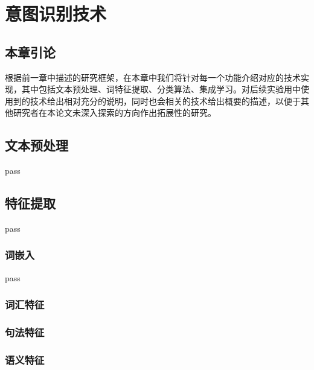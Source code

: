 \chapter{意图识别技术}
\label{cha:tech}

\section{本章引论}

根据前一章中描述的研究框架，在本章中我们将针对每一个功能介绍对应的技术实现，其中包括文本预处理、词特征提取、分类算法、集成学习。对后续实验用中使用到的技术给出相对充分的说明，同时也会相关的技术给出概要的描述，以便于其他研究者在本论文未深入探索的方向作出拓展性的研究。

\section{文本预处理}

pass

\section{特征提取}

pass

\subsection{词嵌入}

pass

\subsection{词汇特征} %


\subsection{句法特征} %


\subsection{语义特征} %

